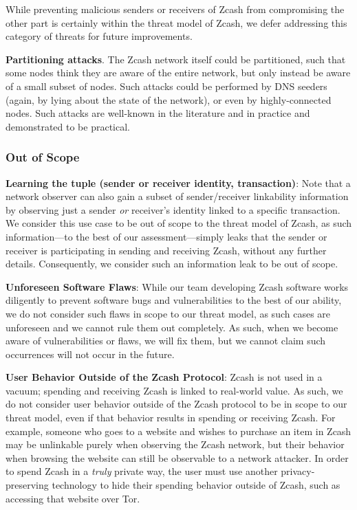 \documentclass{article}
\begin{document}
While preventing malicious
senders or receivers of Zcash from compromising the other part is certainly
within the threat model of Zcash, we defer addressing this category of threats
for future improvements.

\textbf{Partitioning attacks}. The Zcash network itself could be partitioned,
such that some nodes think they are aware of the entire network, but only
instead be aware of a small subset of nodes. Such attacks could be performed by
DNS seeders (again, by lying about the state of the network), or even by
highly-connected nodes. Such attacks are well-known in the literature and in
practice and demonstrated to be practical.

\subsubsection{Out of Scope}
\label{out-of-scope}

\textbf{Learning the tuple (sender or receiver identity, transaction)}:
Note that a network observer can also gain a subset of sender/receiver
linkability information by
observing just a sender \emph{or} receiver's identity linked to a specific
transaction. We consider this use case to be out of scope to the threat model
of Zcash, as such
information---to the best of our assessment---simply leaks that the sender or
receiver is participating in sending and receiving Zcash, without any further
details. Consequently, we consider such an information leak to be out of scope.

\textbf{Unforeseen Software Flaws}: While our team developing Zcash software
works diligently to prevent software bugs and vulnerabilities to the best of
our ability, we do not
consider such flaws in scope to our threat model, as such cases are unforeseen
and we cannot rule them out completely. As such, when we become aware of
vulnerabilities or flaws, we will fix them, but we cannot claim such
occurrences will not occur in the future.

\textbf{User Behavior Outside of the Zcash Protocol}: Zcash is not used in a
vacuum; spending and receiving Zcash is linked to real-world value. As such, we
do not consider user behavior outside of the Zcash protocol to be in scope to
our threat model, even if that behavior results in spending or receiving Zcash.
For example, someone who goes to a website and wishes to purchase an item in
Zcash may be unlinkable purely when observing the Zcash network, but their
behavior when browsing the website can still be observable to a network
attacker. In order to spend Zcash in a \emph{truly} private way, the user must
use another privacy-preserving technology to hide their spending behavior
outside of Zcash, such as accessing that website over Tor.
\end{document}
